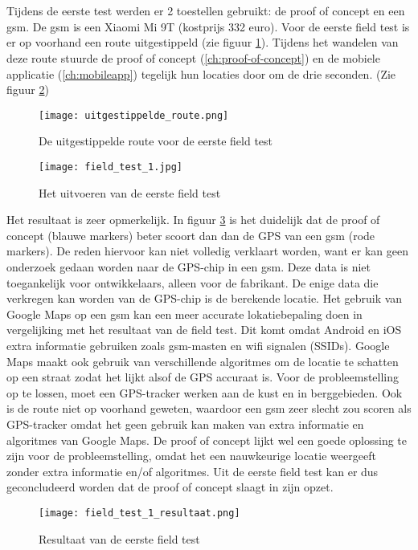\section{}
Tijdens de eerste test werden er 2 toestellen gebruikt: de proof of concept en een gsm. De gsm is een Xiaomi Mi 9T (kostprijs 332 euro).
Voor de eerste field test is er op voorhand een route uitgestippeld (zie figuur \ref{fig:uitgestippelde_route}). Tijdens het wandelen van deze route stuurde de proof of concept (\ref{ch:proof-of-concept}) en de mobiele applicatie (\ref{ch:mobileapp}) tegelijk hun locaties door om de drie seconden. (Zie figuur \ref{fig:field_test_1})
\begin{figure}
	\texttt{[image: uitgestippelde\_route.png]}
	\caption{De uitgestippelde route voor de eerste field test}
	\label{fig:uitgestippelde_route}
\end{figure}
\begin{figure}
	\texttt{[image: field\_test\_1.jpg]}
	\caption{Het uitvoeren van de eerste field test}
	\label{fig:field_test_1}
\end{figure}
\newline
\newline
Het resultaat is zeer opmerkelijk. In figuur \ref{fig:field_test_1_resultaat} is het duidelijk dat de proof of concept (blauwe markers) beter scoort dan dan de GPS van een gsm (rode markers). De reden hiervoor kan niet volledig verklaart worden, want er kan geen onderzoek gedaan worden naar de GPS-chip in een gsm. Deze data is niet toegankelijk voor ontwikkelaars, alleen voor de fabrikant. De enige data die verkregen kan worden van de GPS-chip is de berekende locatie. 
\newline
Het gebruik van Google Maps op een gsm kan een meer accurate lokatiebepaling doen in vergelijking met het resultaat van de field test. Dit komt omdat Android en iOS extra informatie gebruiken zoals gsm-masten en wifi signalen (SSIDs). Google Maps maakt ook gebruik van verschillende algoritmes om de locatie te schatten op een straat zodat het lijkt alsof de GPS accuraat is.
\newline
Voor de probleemstelling op te lossen, moet een GPS-tracker werken aan de kust en in berggebieden. Ook is de route niet op voorhand geweten, waardoor een gsm zeer slecht zou scoren als GPS-tracker omdat het geen gebruik kan maken van extra informatie en algoritmes van Google Maps. De proof of concept lijkt wel een goede oplossing te zijn voor de probleemstelling, omdat het een nauwkeurige locatie weergeeft zonder extra informatie en/of algoritmes. 
\newline
Uit de eerste field test kan er dus geconcludeerd worden dat de proof of concept slaagt in zijn opzet.
\begin{figure}
	\texttt{[image: field\_test\_1\_resultaat.png]}
	\caption{Resultaat van de eerste field test}
	\label{fig:field_test_1_resultaat}
\end{figure}